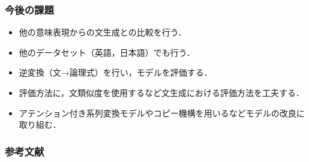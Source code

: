 \documentclass[dvipdfmx]{beamer}
\begin{document}
\begin{frame}
\frametitle{今後の課題}
\begin{itemize}
\item 他の意味表現からの文生成との比較を行う．
\item 他のデータセット（英語，日本語）でも行う．
\item 逆変換（文→論理式）を行い，モデルを評価する．
\item 評価方法に，文類似度を使用するなど文生成における評価方法を工夫する．
\item アテンション付き系列変換モデルやコピー機構を用いるなどモデルの改良に取り組む．


\end{itemize}

\end{frame}


\begin{frame}[allowframebreaks]
\frametitle{参考文献}
\notautomath
\small


\nocite{*}

\end{frame}


\end{document}
